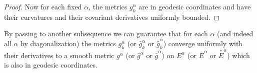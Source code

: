 \begin{proof}
Now for each fixed $\alpha$, the metrics $g_k^{\alpha}$ are in
geodesic coordinates and have their curvatures and their covariant
derivatives uniformly bounded.

\end{proof}
\begin{proposition}
  \label{prop:cz-local-metric-subsequence-convergence}
By passing to another subsequence we
can guarantee that for each $\alpha$ (and indeed all $\alpha$ by
diagonalization) the metrics $g_k^{\alpha}$ (or $\bar
g_k^{\alpha}$ or ${\bar{\bar g}}_k^{\alpha}$) converge uniformly
with their derivatives to a smooth metric $g^{\alpha}$ (or $\bar
g^{\alpha}$ or ${\bar{\bar g}}^{\alpha}$) on $E^{\alpha}$ (or
$\bar E^{\alpha}$ or ${\bar{\bar E}}^{\alpha}$) which is also in
geodesic coordinates.
\end{proposition}
